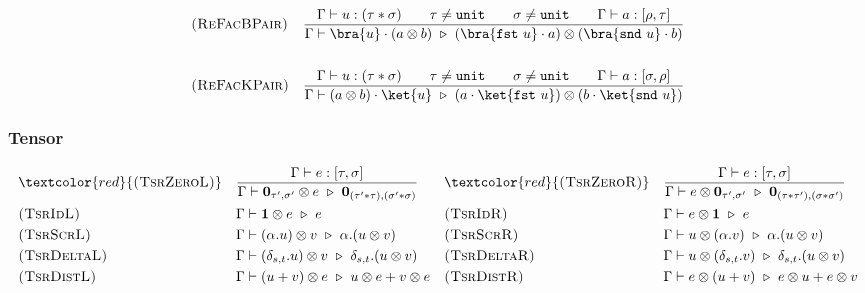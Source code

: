\begin{align*}
  & \textsc{(ReFacBPair)} && \frac{\Gamma \vdash u : (\tau * \sigma) \qquad \tau \neq \unit \qquad \sigma \neq \unit \qquad \Gamma \vdash a : [\rho, \tau]}{\Gamma \vdash \bra{u} \cdot (a \otimes b) \reduce (\bra{\fst\ u} \cdot a) \otimes (\bra{\snd\ u} \cdot b)} \\
  \\
  & \textsc{(ReFacKPair)} && \frac{\Gamma \vdash u : (\tau * \sigma) \qquad \tau \neq \unit \qquad \sigma \neq \unit \qquad \Gamma \vdash a : [\sigma, \rho]}{\Gamma \vdash (a \otimes b) \cdot \ket{u}  \reduce (a \cdot \ket{\fst\ u}) \otimes (b \cdot \ket{\snd\ u})}
\end{align*}


\subsubsection*{Tensor}
\begin{align*}
  & \textcolor{red}{\textsc{(TsrZeroL)}} && 
  \frac{\Gamma \vdash e : [\tau, \sigma]}{\Gamma \vdash \textbf{0}_{\tau', \sigma'} \otimes e \reduce \textbf{0}_{(\tau' * \tau), (\sigma' * \sigma)}} 
  && \textcolor{red}{\textsc{(TsrZeroR)}} && 
  \frac{\Gamma \vdash e : [\tau, \sigma]}{\Gamma \vdash e \otimes \textbf{0}_{\tau', \sigma'} \reduce \textbf{0}_{(\tau * \tau'), (\sigma * \sigma')}} \\
  & \textsc{(TsrIdL)} && 
  \Gamma \vdash \mathbf{1} \otimes e \reduce e
  && \textsc{(TsrIdR)} && 
  \Gamma \vdash e \otimes \mathbf{1} \reduce e
  \\
  & \textsc{(TsrScrL)} && \Gamma \vdash (\alpha.u) \otimes v \reduce \alpha.(u \otimes v) 
  && \textsc{(TsrScrR)} && \Gamma \vdash u \otimes (\alpha.v) \reduce \alpha.(u \otimes v)
  \\
  & \textsc{(TsrDeltaL)} && \Gamma \vdash (\delta_{s, t}.u) \otimes v \reduce \delta_{s, t}.(u \otimes v) 
  && \textsc{(TsrDeltaR)} && \Gamma \vdash u \otimes (\delta_{s, t}.v) \reduce \delta_{s, t}.(u \otimes v)
  \\
  & \textsc{(TsrDistL)} && \Gamma \vdash (u + v) \otimes e \reduce u \otimes e + v \otimes e
  && \textsc{(TsrDistR)} && \Gamma \vdash e \otimes (u + v) \reduce e \otimes u + e \otimes v
\end{align*}
  
